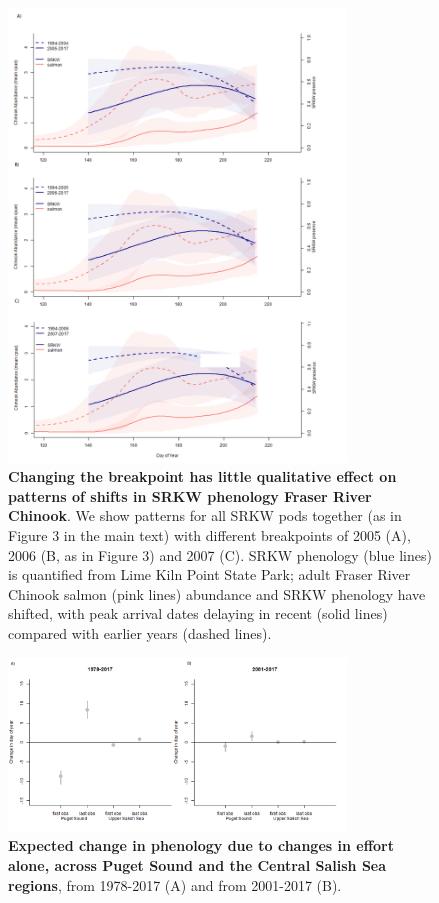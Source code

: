 \documentclass{article}
\begin{document}
\newpage
\begin{figure}[p]
\includegraphics[width=0.8\textwidth]{../analyses/orcaphen/figures/orcachinphenoverlapALLSR20052007.png}
\caption{\textbf{Changing the breakpoint has little qualitative effect on patterns of shifts in SRKW phenology Fraser River Chinook}. We show patterns for all SRKW pods together (as in Figure 3 in the main text) with different breakpoints of 2005 (A), 2006 (B, as in Figure 3) and 2007 (C). SRKW phenology (blue lines) is quantified from Lime Kiln Point State Park; adult Fraser River Chinook salmon (pink lines) abundance and SRKW phenology have shifted, with peak arrival dates delaying in recent (solid lines) compared with earlier years (dashed lines).}
\label{fig:brkpt}
\end{figure}


\begin{figure}[p]
\includegraphics[width=0.8\textwidth]{../analyses/orcaphen/figures/simeffortonly2panels.png} 
\caption{\textbf{Expected change in phenology due to changes in effort alone, across Puget Sound and the Central Salish Sea regions}, from 1978-2017 (A) and from 2001-2017 (B). }
\label{fig:simeffort}
\end{figure}
\end{document}
